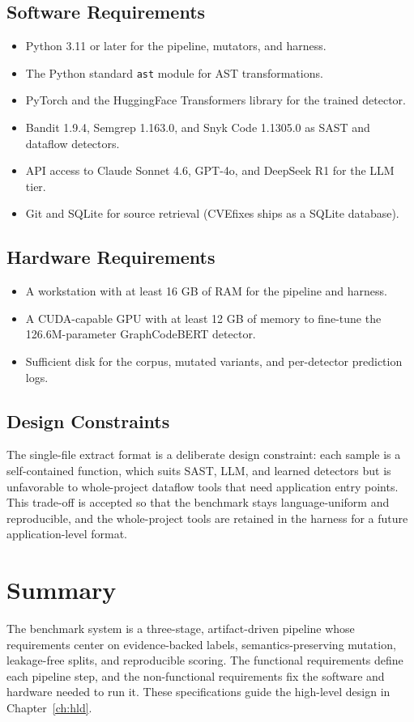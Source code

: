 \subsection{Software Requirements}

\begin{itemize}
  \item Python 3.11 or later for the pipeline, mutators, and harness.
  \item The Python standard \texttt{ast} module for AST transformations.
  \item PyTorch and the HuggingFace Transformers library for the trained
    detector.
  \item Bandit 1.9.4, Semgrep 1.163.0, and Snyk Code 1.1305.0 as SAST and
    dataflow detectors.
  \item API access to Claude Sonnet 4.6, GPT-4o, and DeepSeek R1 for the LLM
    tier.
  \item Git and SQLite for source retrieval (CVEfixes ships as a SQLite
    database).
\end{itemize}

\subsection{Hardware Requirements}

\begin{itemize}
  \item A workstation with at least 16 GB of RAM for the pipeline and harness.
  \item A CUDA-capable GPU with at least 12 GB of memory to fine-tune the
    126.6M-parameter GraphCodeBERT detector.
  \item Sufficient disk for the corpus, mutated variants, and per-detector
    prediction logs.
\end{itemize}

\subsection{Design Constraints}

The single-file extract format is a deliberate design constraint: each sample is
a self-contained function, which suits SAST, LLM, and learned detectors but is
unfavorable to whole-project dataflow tools that need application entry points.
This trade-off is accepted so that the benchmark stays language-uniform and
reproducible, and the whole-project tools are retained in the harness for a
future application-level format.

\section{Summary}

The benchmark system is a three-stage, artifact-driven pipeline whose
requirements center on evidence-backed labels, semantics-preserving mutation,
leakage-free splits, and reproducible scoring. The functional requirements
define each pipeline step, and the non-functional requirements fix the software
and hardware needed to run it. These specifications guide the high-level design
in Chapter~\ref{ch:hld}.
